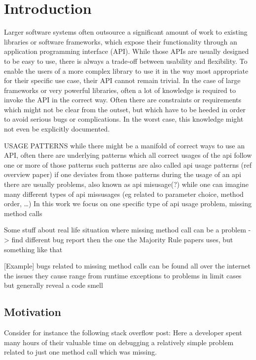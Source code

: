 \chapter{Introduction}\label{chapter:introduction}

Larger software systems often outsource a significant amount of work to existing libraries or software frameworks, which expose their functionality through an application programming interface (API).
While those APIs are usually designed to be easy to use, there is always a trade-off between usability and flexibility.
To enable the users of a more complex library to use it in the way most appropriate for their specific use case, their API cannot remain trivial.
In the case of large frameworks or very powerful libraries, often a lot of knowledge is required to invoke the API in the correct way.
Often there are constraints or requirements which might not be clear from the outset, but which have to be heeded in order to avoid serious bugs or complications.
In the worst case, this knowledge might not even be explicitly documented.

USAGE PATTERNS
while there might be a manifold of correct ways to use an API, often there are underlying patterns which 
all correct usages of the api follow one or more of those patterns
such patterns are also called api usage patterns (ref overview paper)
if one deviates from those patterns during the usage of an api there are usually problems, also known as api misusage(?)
while one can imagine many different types of api missusages (eg related to parameter choice, method order, \ldots)
In this work we focus on one specific type of api usage problem, missing method calls

Some stuff about real life situation where missing method call can be a problem
-> find different bug report then the one the Majority Rule papers uses, but something like that

[Example]
bugs related to missing method calls can be found all over the internet
the issues they cause range from runtime exceptions to problems in limit cases
but generally reveal a code smell

\section{Motivation}

Consider for instance the following stack overflow post:
Here a developer spent many hours of their valuable time on debugging a relatively simple problem related to just one method call which was missing.

